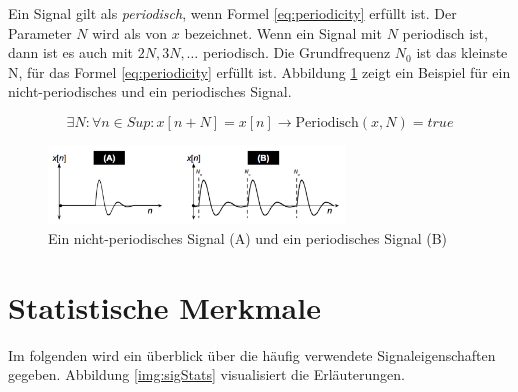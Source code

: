 Ein Signal gilt als \emph{periodisch}, wenn Formel \ref{eq:periodicity} erfüllt ist. Der Parameter $N$ wird als  von $x$ bezeichnet. Wenn ein Signal mit $N$ periodisch ist, dann ist es auch mit $2N, 3N, \ldots $ periodisch. Die Grundfrequenz $N_0$ ist das kleinste N, für das Formel \ref{eq:periodicity} erfüllt ist. Abbildung \ref{img:periodicSic} zeigt ein Beispiel für ein nicht-periodisches und ein periodisches Signal. \cite[S. 24]{dspMichigan}

\begin{equation}
\exists N : \forall n \in Sup : x[n+N] = x[n] \rightarrow \text{Periodisch}(x,N) = true
\label{eq:periodicity}
\end{equation}

\begin{figure}[h]
	\centering
	\includegraphics[width=0.7\textwidth]{bilder/periodicSig.png}
	\caption{Ein nicht-periodisches Signal (A) und ein periodisches Signal (B)}
	\label{img:periodicSic}
\end{figure}

\section{Statistische Merkmale}

Im folgenden wird ein überblick über die häufig verwendete Signaleigenschaften gegeben. Abbildung \ref{img:sigStats} visualisiert die Erläuterungen.


